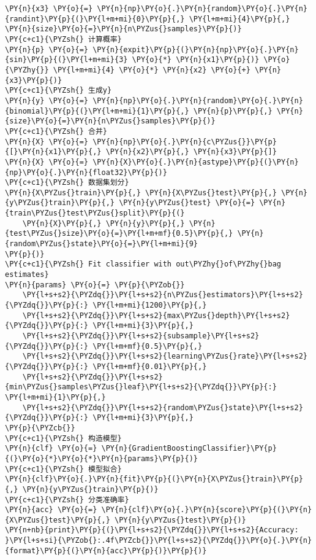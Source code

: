 \begin{Verbatim}[commandchars=\\\{\}]
\PY{n}{x3} \PY{o}{=} \PY{n}{np}\PY{o}{.}\PY{n}{random}\PY{o}{.}\PY{n}{randint}\PY{p}{(}\PY{l+m+mi}{0}\PY{p}{,} \PY{l+m+mi}{4}\PY{p}{,} \PY{n}{size}\PY{o}{=}\PY{n}{n\PYZus{}samples}\PY{p}{)}
\PY{c+c1}{\PYZsh{} 计算概率}
\PY{n}{p} \PY{o}{=} \PY{n}{expit}\PY{p}{(}\PY{n}{np}\PY{o}{.}\PY{n}{sin}\PY{p}{(}\PY{l+m+mi}{3} \PY{o}{*} \PY{n}{x1}\PY{p}{)} \PY{o}{\PYZhy{}} \PY{l+m+mi}{4} \PY{o}{*} \PY{n}{x2} \PY{o}{+} \PY{n}{x3}\PY{p}{)}
\PY{c+c1}{\PYZsh{} 生成y}
\PY{n}{y} \PY{o}{=} \PY{n}{np}\PY{o}{.}\PY{n}{random}\PY{o}{.}\PY{n}{binomial}\PY{p}{(}\PY{l+m+mi}{1}\PY{p}{,} \PY{n}{p}\PY{p}{,} \PY{n}{size}\PY{o}{=}\PY{n}{n\PYZus{}samples}\PY{p}{)}
\PY{c+c1}{\PYZsh{} 合并}
\PY{n}{X} \PY{o}{=} \PY{n}{np}\PY{o}{.}\PY{n}{c\PYZus{}}\PY{p}{[}\PY{n}{x1}\PY{p}{,} \PY{n}{x2}\PY{p}{,} \PY{n}{x3}\PY{p}{]}
\PY{n}{X} \PY{o}{=} \PY{n}{X}\PY{o}{.}\PY{n}{astype}\PY{p}{(}\PY{n}{np}\PY{o}{.}\PY{n}{float32}\PY{p}{)}
\PY{c+c1}{\PYZsh{} 数据集划分}
\PY{n}{X\PYZus{}train}\PY{p}{,} \PY{n}{X\PYZus{}test}\PY{p}{,} \PY{n}{y\PYZus{}train}\PY{p}{,} \PY{n}{y\PYZus{}test} \PY{o}{=} \PY{n}{train\PYZus{}test\PYZus{}split}\PY{p}{(}
    \PY{n}{X}\PY{p}{,} \PY{n}{y}\PY{p}{,} \PY{n}{test\PYZus{}size}\PY{o}{=}\PY{l+m+mf}{0.5}\PY{p}{,} \PY{n}{random\PYZus{}state}\PY{o}{=}\PY{l+m+mi}{9}
\PY{p}{)}
\PY{c+c1}{\PYZsh{} Fit classifier with out\PYZhy{}of\PYZhy{}bag estimates}
\PY{n}{params} \PY{o}{=} \PY{p}{\PYZob{}}
    \PY{l+s+s2}{\PYZdq{}}\PY{l+s+s2}{n\PYZus{}estimators}\PY{l+s+s2}{\PYZdq{}}\PY{p}{:} \PY{l+m+mi}{1200}\PY{p}{,}
    \PY{l+s+s2}{\PYZdq{}}\PY{l+s+s2}{max\PYZus{}depth}\PY{l+s+s2}{\PYZdq{}}\PY{p}{:} \PY{l+m+mi}{3}\PY{p}{,}
    \PY{l+s+s2}{\PYZdq{}}\PY{l+s+s2}{subsample}\PY{l+s+s2}{\PYZdq{}}\PY{p}{:} \PY{l+m+mf}{0.5}\PY{p}{,}
    \PY{l+s+s2}{\PYZdq{}}\PY{l+s+s2}{learning\PYZus{}rate}\PY{l+s+s2}{\PYZdq{}}\PY{p}{:} \PY{l+m+mf}{0.01}\PY{p}{,}
    \PY{l+s+s2}{\PYZdq{}}\PY{l+s+s2}{min\PYZus{}samples\PYZus{}leaf}\PY{l+s+s2}{\PYZdq{}}\PY{p}{:} \PY{l+m+mi}{1}\PY{p}{,}
    \PY{l+s+s2}{\PYZdq{}}\PY{l+s+s2}{random\PYZus{}state}\PY{l+s+s2}{\PYZdq{}}\PY{p}{:} \PY{l+m+mi}{3}\PY{p}{,}
\PY{p}{\PYZcb{}}
\PY{c+c1}{\PYZsh{} 构造模型}
\PY{n}{clf} \PY{o}{=} \PY{n}{GradientBoostingClassifier}\PY{p}{(}\PY{o}{*}\PY{o}{*}\PY{n}{params}\PY{p}{)}
\PY{c+c1}{\PYZsh{} 模型拟合}
\PY{n}{clf}\PY{o}{.}\PY{n}{fit}\PY{p}{(}\PY{n}{X\PYZus{}train}\PY{p}{,} \PY{n}{y\PYZus{}train}\PY{p}{)}
\PY{c+c1}{\PYZsh{} 分类准确率}
\PY{n}{acc} \PY{o}{=} \PY{n}{clf}\PY{o}{.}\PY{n}{score}\PY{p}{(}\PY{n}{X\PYZus{}test}\PY{p}{,} \PY{n}{y\PYZus{}test}\PY{p}{)}
\PY{n+nb}{print}\PY{p}{(}\PY{l+s+s2}{\PYZdq{}}\PY{l+s+s2}{Accuracy: }\PY{l+s+si}{\PYZob{}:.4f\PYZcb{}}\PY{l+s+s2}{\PYZdq{}}\PY{o}{.}\PY{n}{format}\PY{p}{(}\PY{n}{acc}\PY{p}{)}\PY{p}{)}

\end{Verbatim}
